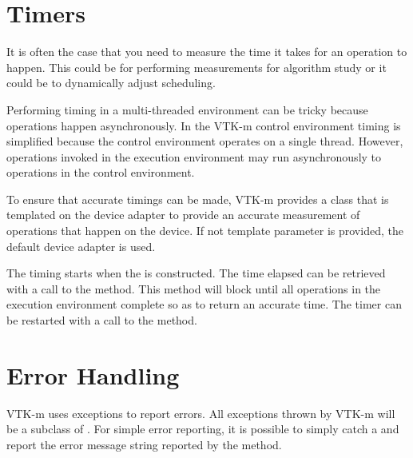 
\section{Timers}
\label{sec:Timers}


It is often the case that you need to measure the time it takes for an
operation to happen. This could be for performing measurements for
algorithm study or it could be to dynamically adjust scheduling.

Performing timing in a multi-threaded environment can be tricky because
operations happen asynchronously. In the VTK-m control environment timing
is simplified because the control environment operates on a single
thread. However, operations invoked in the execution environment may run
asynchronously to operations in the control environment.

To ensure that accurate timings can be made, VTK-m provides a
 class that is templated on the device adapter to provide
an accurate measurement of operations that happen on the device. If not
template parameter is provided, the default device adapter is used.

The timing starts when the  is constructed. The time
elapsed can be retrieved with a call to the 
method. This method will block until all operations in the execution
environment complete so as to return an accurate time. The timer can be
restarted with a call to the  method.




\section{Error Handling}
\label{sec:ErrorHandlingControl}


VTK-m uses exceptions to report errors. All exceptions thrown by VTK-m will
be a subclass of . For simple error reporting, it is
possible to simply catch a  and report the error message
string reported by the  method.

